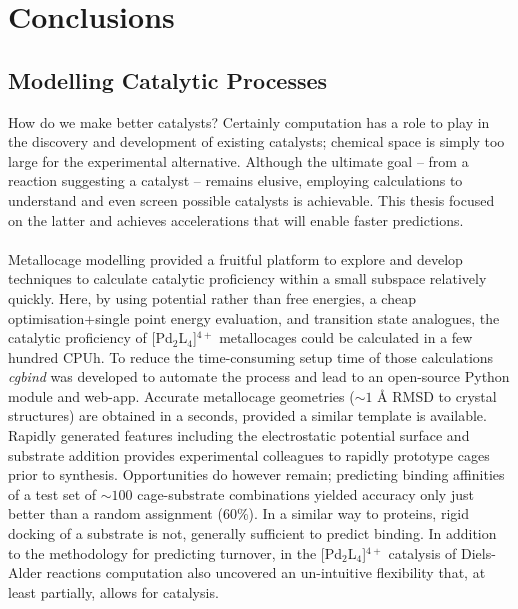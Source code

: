 \documentclass[../main.tex]{subfiles}
\begin{document}
\setcounter{footnote}{0} 


\chapter{Conclusions}

\section{Modelling Catalytic Processes}

How do we make better catalysts? Certainly computation has a role to play in the discovery and development of existing catalysts; chemical space is simply too large for the experimental alternative. Although the ultimate goal -- from a reaction suggesting a catalyst -- remains elusive, employing calculations to understand and even screen possible catalysts is achievable. This thesis focused on the latter and achieves accelerations that will enable faster predictions.
\\\\
Metallocage modelling provided a fruitful platform to explore and develop techniques to calculate catalytic proficiency within a small subspace relatively quickly. Here, by using potential rather than free energies, a cheap optimisation+single point energy evaluation, and transition state analogues, the catalytic proficiency of [Pd${}_2$L${}_4$]${}^{4+}$ metallocages could be calculated in a few hundred CPUh. To reduce the time-consuming setup time of those calculations \emph{cgbind} was developed to automate the process and lead to an open-source Python module and web-app. Accurate metallocage geometries ($\sim1$ \AA${}$ RMSD to crystal structures) are obtained in a seconds, provided a similar template is available. Rapidly generated features including the electrostatic potential surface and substrate addition provides experimental colleagues to rapidly prototype cages prior to synthesis. Opportunities do however remain; predicting binding affinities of a test set of $\sim 100$ cage-substrate combinations yielded accuracy only just better than a random assignment (60\%). In a similar way to proteins, rigid docking of a substrate is not, generally sufficient to predict binding.\cite{Kitchen2004} In addition to the methodology for predicting turnover, in the [Pd${}_2$L${}_4$]${}^{4+}$ catalysis of Diels-Alder reactions computation also uncovered an un-intuitive flexibility that, at least partially, allows for catalysis. 
\\\\
\end{document}

